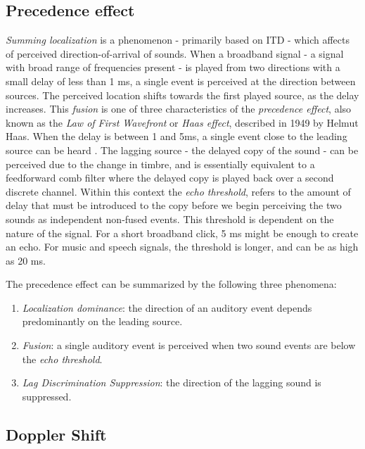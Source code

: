 \subsection{Precedence effect}

\textit{Summing localization} is a phenomenon - primarily based on ITD - which affects of perceived direction-of-arrival of sounds. When a broadband signal - a signal with broad range of frequencies present - is played from two directions with a small delay of less than 1 ms, a single event is perceived at the direction between sources. The perceived location shifts towards the first played source, as the delay increases. This \textit{fusion} is one of three characteristics of the \textit{precedence effect}, also known as the \textit{Law of First Wavefront} or \textit{Haas effect}, described in 1949 by Helmut Haas. When the delay is between 1 and 5ms, a single event close to the leading source can be heard \cite{hacihabiboglu2017perceptual}. The lagging source - the delayed copy of the sound - can be perceived due to the change in timbre, and is essentially equivalent to a feedforward comb filter where the delayed copy is played back over a second discrete channel. Within this context the \textit{echo threshold}, refers to the amount of delay that must be introduced to the copy before we begin perceiving the two sounds as independent non-fused events. This threshold is dependent on the nature of the signal. For a short broadband click, 5 ms might be enough to create an echo. For music and speech signals, the threshold is longer, and can be as high as 20 ms.

The precedence effect can be summarized by the following three phenomena: 

\begin{enumerate}
    \item \textit{Localization dominance}: the direction of an auditory event depends predominantly on the leading source.
    \item \textit{Fusion}: a single auditory event is perceived when two sound events are below the \textit{echo threshold}.
    \item \textit{Lag Discrimination Suppression}: the direction of the lagging sound is suppressed.  
\end{enumerate}

\subsection{Doppler Shift}

